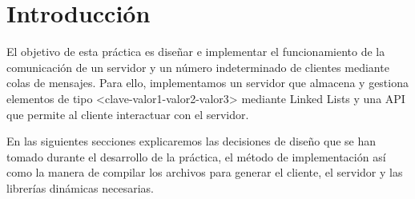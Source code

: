 \section{Introducción}
El objetivo de esta práctica es diseñar e implementar el funcionamiento de la comunicación de un servidor y un número indeterminado de clientes mediante colas de mensajes. 
Para ello, implementamos un servidor que almacena y gestiona elementos de tipo <clave-valor1-valor2-valor3> mediante Linked Lists y una API que permite al cliente interactuar con el servidor.

En las siguientes secciones explicaremos las decisiones de diseño que se han tomado durante el desarrollo de la práctica, el método de implementación así como la manera de compilar los archivos para generar el cliente, el servidor y las librerías dinámicas necesarias.